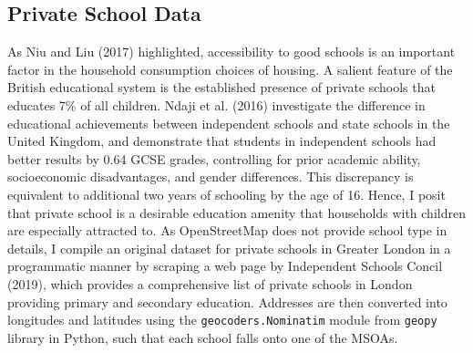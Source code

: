 \documentclass{article}
\begin{document}
\subsection{Private School Data} \label{subsection:school}
As Niu and Liu (2017) highlighted, accessibility to good schools is an important factor in the household consumption choices of housing. A salient feature of the British educational system is the established presence of private schools that educates 7\% of all children. Ndaji et al. (2016) investigate the difference in educational achievements between independent schools and state schools in the United Kingdom, and demonstrate that students in independent schools had better results by 0.64 GCSE grades, controlling for prior academic ability, socioeconomic disadvantages, and gender differences. This discrepancy is equivalent to additional two years of schooling by the age of 16. Hence, I posit that private school is a desirable education amenity that households with children are especially attracted to. As OpenStreetMap does not provide school type in details, I compile an original dataset for private schools in Greater London in a programmatic manner by scraping a web page by Independent Schools Concil (2019), which provides a comprehensive list of private schools in London providing primary and secondary education. Addresses are then converted into longitudes and latitudes using the \texttt{geocoders.Nominatim} module from \texttt{geopy} library in Python, such that each school falls onto one of the MSOAs.
\end{document}
